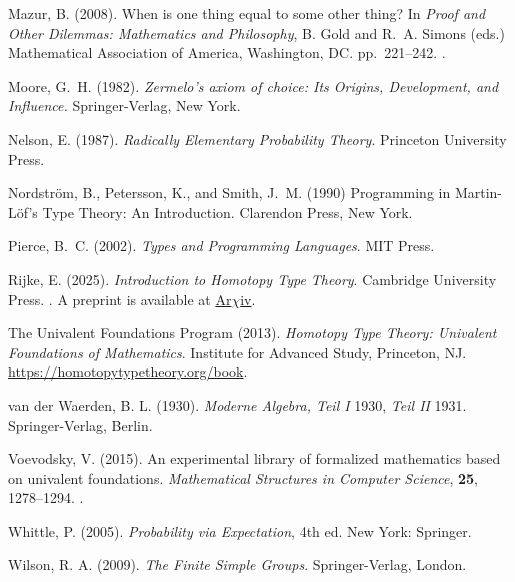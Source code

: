 \documentclass[11pt]{article}
\begin{document}
\begin{thebibliography}{}
Mazur, B. (2008).
\newblock When is one thing equal to some other thing?
\newblock In \emph{Proof and Other Dilemmas: Mathematics and Philosophy},
B. Gold and R.~A. Simons (eds.)
\newblock Mathematical Association of America, Washington, DC.
\newblock pp.~221--242.
\newblock {}.

Moore, G.~H. (1982).
\newblock \emph{Zermelo's axiom of choice: Its Origins, Development,
    and Influence.}
\newblock Springer-Verlag, New York.

Nelson, E. (1987).
\newblock \emph{Radically Elementary Probability Theory}.
\newblock Princeton University Press.

Nordstr\"{o}m, B., Petersson, K., and Smith, J.~M. (1990)
\newblock Programming in Martin-L\"{o}f's Type Theory: An Introduction.
\newblock Clarendon Press, New York.

Pierce, B.~C. (2002).
\newblock \emph{Types and Programming Languages}.
\newblock MIT Press.

Rijke, E. (2025).
\newblock \emph{Introduction to Homotopy Type Theory}.
\newblock Cambridge University Press.
\newblock {}.
\newblock A preprint is available at
    \href{https://arxiv.org/abs/2212.11082}{Ar$\chi$iv}.

The Univalent Foundations Program (2013).
\newblock \emph{Homotopy Type Theory: Univalent Foundations of Mathematics}.
\newblock Institute for Advanced Study, Princeton, NJ.
\newblock \url{https://homotopytypetheory.org/book}.

van der Waerden, B. L. (1930).
\newblock \emph{Moderne Algebra, Teil I} 1930, \emph{Teil II} 1931.
\newblock Springer-Verlag, Berlin.

Voevodsky, V. (2015).
\newblock An experimental library of formalized mathematics based on
    univalent foundations.
\newblock \emph{Mathematical Structures in Computer Science}, \textbf{25},
    1278--1294.
\newblock {}.

Whittle, P. (2005).
\newblock \emph{Probability via Expectation}, 4th ed.
\newblock New York: Springer.

Wilson, R. A. (2009).
\newblock \emph{The Finite Simple Groups}.
\newblock Springer-Verlag, London.

\end{thebibliography}
\end{document}
